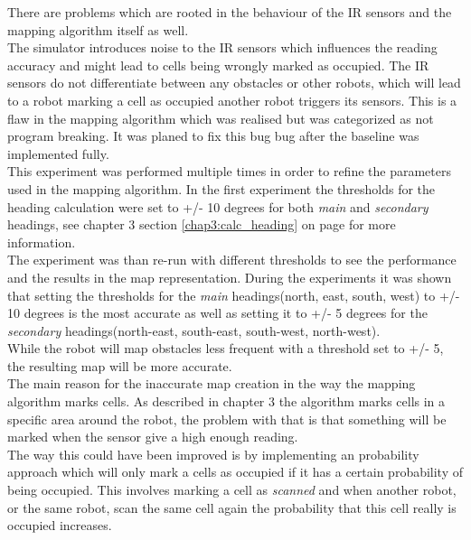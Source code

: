There are problems which are rooted in the behaviour of the IR sensors and the mapping algorithm itself as well.\\
The simulator introduces noise to the IR sensors which influences the reading accuracy and might lead to cells being wrongly marked as occupied. 
The IR sensors do not differentiate between any obstacles or other robots, 
which will lead to a robot marking a cell as occupied another robot triggers its sensors. This is a flaw in the mapping algorithm which was realised but was categorized as not program breaking. It was planed to fix this bug bug after the baseline was implemented fully. \\ 

This experiment was performed multiple times in order to refine the parameters used in the mapping algorithm. In the first experiment the thresholds for the heading calculation were set to +/- 10 degrees for both \textit{main} and \textit{secondary} headings, see chapter 3 section \ref{chap3:calc_heading} on page \pageref{chap3:calc_heading} for more information. \\
The experiment was than re-run with different thresholds to see the performance and the results in the map representation. 
During the experiments it was shown that setting the thresholds for the \textit{main} headings(north, east, south, west) to +/- 10 degrees is the most accurate as well as setting it to +/- 5 degrees for the \textit{secondary} headings(north-east, south-east, south-west, north-west).\\
While the robot will map obstacles less frequent with a threshold set to +/- 5, the resulting map will be more accurate. \\

The main reason for the inaccurate map creation in the way the mapping algorithm marks cells. As described in chapter 3 the algorithm marks cells in a specific area around the robot, the problem with that is that something will be marked when the sensor give a high enough reading. \\
The way this could have been improved is by implementing an probability approach which will only mark a cells as occupied if it has a certain probability of being occupied. This involves marking a cell as \textit{scanned} and when another robot, or the same robot, scan the same cell again the probability that this cell really is occupied increases. 